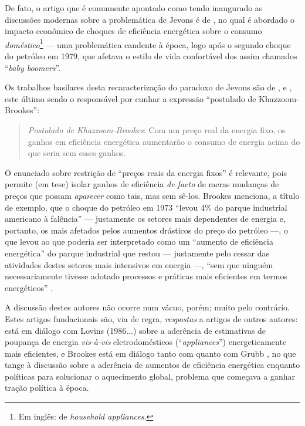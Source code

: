 De fato, o artigo que é comumente apontado como tendo inaugurado as discussões modernas sobre a problemática de Jevons é de \textcite{Khazzoom1980}, no qual é abordado o impacto econômico de choques de eficiência energética sobre o consumo \textit{doméstico}\footnote{Em inglês: de \textit{household appliances}.} --- uma problemática candente à época, logo após o segundo choque do petróleo em 1979, que afetava o estilo de vida confortável dos assim chamados ``\textit{baby boomers}''.

Os trabalhos basilares desta recaracterização do paradoxo de Jevons são de \textcite{Khazzoom1980, Khazzoom1987}, \textcite{Brookes1990} e \textcite{Saunders1992}, este último sendo o responsável por cunhar a expressão ``postulado de Khazzoom-Brookes'': 
\begin{quote}
    \textit{Postulado de Khazzoom-Brookes}: Com um preço real da energia fixo, os ganhos em eficiência energética aumentarão o consumo de energia acima do que seria sem esses ganhos. \parencite[p. 135]{Saunders1992}
\end{quote}

O enunciado sobre restrição de ``preços reais da energia fixos'' é relevante, pois permite (em tese) isolar ganhos de eficiência \textit{de facto} de meras mudanças de preços que possam \textit{aparecer} como tais, mas sem sê-los. Brookes menciona, a título de exemplo, que o choque do petróleo em 1973 ``levou 4\% do parque industrial americano à falência'' --- justamente os setores mais dependentes de energia e, portanto, os mais afetados pelos aumentos drásticos do preço do petróleo ---, o que levou ao que poderia ser interpretado como um ``aumento de eficiência energética'' do parque industrial que restou --- justamente pelo cessar das atividades destes setores mais intensivos em energia ---, ``sem que ninguém necessariamente tivesse adotado processos e práticas mais eficientes em termos energéticos'' \parencite[p. 323]{Brookes1990}. 

A discussão destes autores não ocorre num vácuo, porém; muito pelo contrário. Estes artigos fundacionais são, via de regra, \textit{respostas} a artigos de outros autores: \textcite{Khazzoom1987} está em diálogo com Lovins (1986...) sobre a aderência de estimativas de poupança de energia \textit{vis-à-vis} eletrodomésticos (``\textit{appliances}'') energeticamente mais eficientes, e Brookes está em diálogo tanto com \textcite{Keepin1988,Keepin1989,Jones1989} quanto com Grubb \parencite{Brookes1990,Brookes1992,Brookes1993,Grubb1990,Grubb1992}, no que tange à discussão sobre a aderência de aumentos de eficiência energética enquanto políticas para solucionar o aquecimento global, problema que começava a ganhar tração política à época. 


